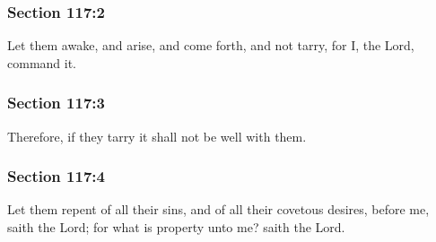 
	\subsubsection{Section 117:2} %
		\label{DC117-2}

		Let them awake, and arise, and come forth, and not tarry, for I, the Lord, command it.


	\subsubsection{Section 117:3} %
		\label{DC117-3}

		Therefore, if they tarry it shall not be well with them.


	\subsubsection{Section 117:4} %
		\label{DC117-4}

		Let them repent of all their sins, and of all their covetous desires, before me, saith the Lord; for what is property unto me?  saith the Lord.

